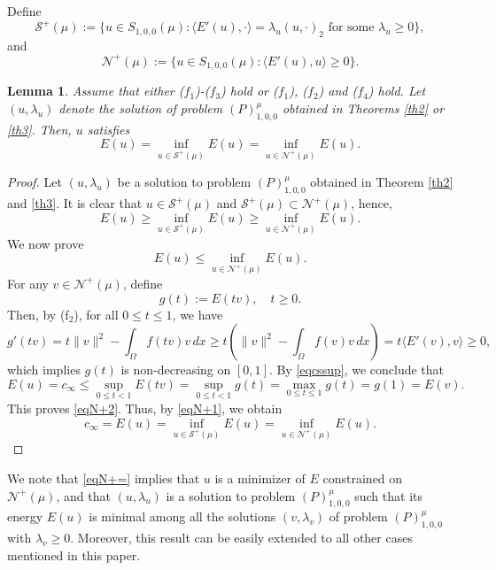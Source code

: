 \documentclass[11pt]{amsart}
\newtheorem{lemma}[theorem]{Lemma}
\newcommand{\norm}[1]{\lVert#1\rVert}
\numberwithin{equation}{section}
\begin{document}
Define
$$
\mathcal{S}^+(\mu):=\{u \in S_{1,0,0}(\mu):\langle E'(u),\cdot \rangle=\lambda_u (u,\cdot)_2\text{ for some } \lambda_u \geq 0 \},
$$
and
\begin{equation}\label{eqdefn+}
    \mathcal{N}^+(\mu):=\{u \in S_{1,0,0}(\mu):\langle E'(u),u\rangle \geq 0\}.
\end{equation}
\begin{lemma}\label{lemminima}
   Assume that either ($f_1$)-($f_3$) hold or ($f_1$), ($f_2$) and ($f_4$) hold. Let $(u,\lambda_u)$ denote the solution of problem $(P)^{\mu}_{1,0,0}$ obtained in Theorems \ref{th2} or \ref{th3}. Then, $u$ satisfies
    \begin{equation}\label{eqN+=}
        E(u)= \inf_{u \in \mathcal{S}^+(\mu)}E(u)= \inf_{u \in \mathcal{N}^+(\mu)}E(u).
    \end{equation}
\end{lemma}
\begin{proof}
Let $(u,\lambda_u)$ be a solution to problem $(P)^{\mu}_{1,0,0}$ obtained in Theorem \ref{th2} and \ref{th3}. It is clear that $u \in \mathcal{S}^+(\mu)$ and $\mathcal{S}^+(\mu)\subset \mathcal{N}^+(\mu)$, hence,
\begin{equation}\label{eqN+1}
E(u)\geq \inf_{u \in \mathcal{S}^+(\mu)}E(u)\geq \inf_{u \in \mathcal{N}^+(\mu)}E(u).
\end{equation}
We now prove
\begin{equation}\label{eqN+2}
    E(u) \leq  \inf_{u \in \mathcal{N}^+(\mu)}E(u).
\end{equation}
 For any $v \in \mathcal{N}^+(\mu)$, define
 $$
 g(t):= E(tv),\quad t\geq 0.
 $$
Then, by (f$_2$), for all $0\leq t \leq 1$, we have
$$
g'(tv) = t \norm{v}^2-\int_\Omega f(tv)v\,dx \geq  t\left(\norm{v}^2-\int_\Omega f(v)v\,dx\right)=t\langle E'(v),v\rangle\geq 0,
$$
which implies $g(t)$ is non-decreasing on $[0,1]$.
By \eqref{eqcssup}, we conclude that
$$
E(u)=c_\infty\leq \sup _{0 \leq t<1} E(t v) =\sup _{0 \leq t<1} g(t) = \max _{0 \leq t\leq 1}g(t)=g(1)=E(v).
$$
This proves \eqref{eqN+2}. Thus, by \eqref{eqN+1}, we obtain
\begin{equation*}
    c_\infty=E(u)= \inf_{u \in \mathcal{S}^+(\mu)}E(u)= \inf_{u \in \mathcal{N}^+(\mu)}E(u).
\end{equation*}
\end{proof}

We note that \eqref{eqN+=} implies that $u$ is a minimizer of $E$ constrained on $\mathcal{N}^+(\mu)$,  and that $(u,\lambda_u)$ is a solution to  problem $(P)^{\mu}_{1,0,0}$ such that its energy $E(u)$ is minimal among all the solutions $(v,\lambda_v)$ of problem $(P)^{\mu}_{1,0,0}$ with $\lambda_v \geq 0$. Moreover, this result can be easily extended to all other cases mentioned in this paper.
\end{document}
